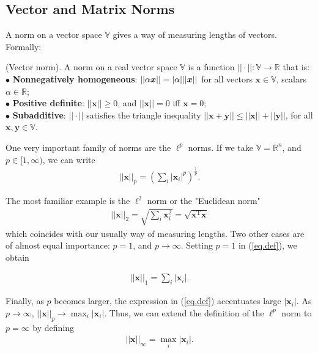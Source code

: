 \documentclass[10pt]{article}
\begin{document}
\subsection{Vector and Matrix Norms}
A norm on a vector space $\mathbb{V}$ gives a way of measuring lengths of vectors. Formally:
\begin{definition}(Vector norm).
A norm on a real vector space $\mathbb{V}$ is a function $||\cdot||: \mathbb{V} \rightarrow \mathbb{R}$ that is:\\
$\bullet$ \textbf{Nonnegatively homogeneous}: $||\alpha \bm{x}||=\lvert\alpha\rvert||\bm{x}||$ for all vectors $\bm{x}\in \mathbb{V}$, scalars $\alpha \in \mathbb{R}$;\\
$\bullet$ \textbf{Positive definite}: $||\bm{x}||\geq 0$, and $||\bm{x}|| =0$ iff $\bm{x}=0$;\\
$\bullet$ \textbf{Subadditive}: $||\cdot||$ satisfies the triangle inequality $||\bm{x} + \bm{y}|| \leq ||\bm{x}|| + ||\bm{y}||$, for all $\bm{x}, \bm{y} \in \mathbb{V}$.
\end{definition}

One very important family of norms are the $\mathcal{\ell}^p$ norms. If we take $\mathbb{V}=\mathbb{R}^n$, and $p\in [1,\infty)$, we can write
\begin{align}\label{eq.def}
||\bm{x}||_p = \left(\sum_i |\bm{x}_i|^p\right)^{\frac{1}{p}}.
\end{align}

The most familiar example is the $\ell^2$ norm or the "Euclidean norm"
\begin{align*}
    ||\bm{x}||_2 = \sqrt{\sum_i \bm{x}_i^2} = 
    \sqrt{\bm{x}^{\mathrm{T}}\bm{x}}
\end{align*}
which coincides with our usually way of measuring lengths. Two other cases are of almost equal importance: $p =1$, and $p\rightarrow \infty$. Setting $p=1$ in (\ref{eq.def}), we obtain

\begin{align*}
    ||\bm{x}||_1 = \sum_i |\bm{x}_i| .
\end{align*}

Finally, as $p$ becomes larger, the expression in (\ref{eq.def}) accentuates large $|\bm{x}_i|$. As $p\rightarrow \infty$, $||\bm{x}||_p \rightarrow \max_{i}|\bm{x}_i|$. Thus, we can extend the definition of the $\ell^p$ norm to $p=\infty$ by defining
\begin{align*}
    ||\bm{x}||_\infty = \max_i |\bm{x}_i| .
\end{align*}
\end{document}
